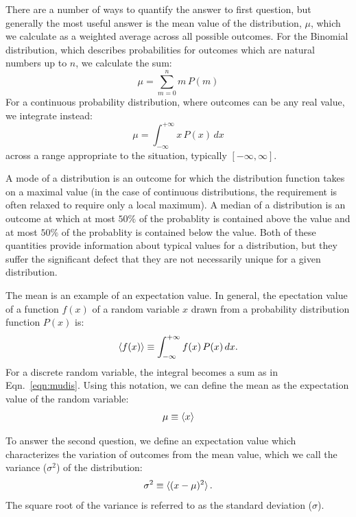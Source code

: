 \documentclass[12pt,oneside]{book}
\begin{document}
There are a number of ways to quantify the answer to first question,
but generally the most useful answer is the mean value of the
distribution, $\mu$, which we calculate as a weighted average across
all possible outcomes.  For the Binomial distribution, which describes
probabilities for outcomes which are natural numbers up to $n$, we
calculate the sum:
\begin{equation}
\label{eqn:mudis}
\mu = \sum_{m=0}^{n} m \, P(m)
\end{equation}
For a continuous probability distribution, where outcomes can be any
real value, we integrate instead:
\begin{equation}
\mu = \int_{-\infty}^{+\infty} x \, P(x) \, dx 
\end{equation}
across a range appropriate to the situation, typically $[-\infty,\infty]$.

A mode of a distribution is an outcome for which the distribution
function takes on a maximal value (in the case of continuous
distributions, the requirement is often relaxed to require only a
local maximum).  A median of a distribution is an outcome at which at
most $50\%$ of the probablity is contained above the value and at most
$50\%$ of the probablity is contained below the value.  Both of these
quantities provide information about typical values for a
distribution, but they suffer the significant defect that they are not
necessarily unique for a given distribution.

The mean is an example of an expectation value.  In general, the
epectation value of a function $f(x)$ of a random variable $x$ drawn
from a probability distribution function $P(x)$ is:
\begin{displaymath}
\braket{f(x)} \equiv \int_{-\infty}^{+\infty} f(x) \, P(x) \,dx.
\end{displaymath}
For a discrete random variable, the integral becomes a sum as in
Eqn.~\ref{eqn:mudis}.  Using this notation, we can define the mean as the
expectation value of the random variable:
\begin{displaymath}
\mu \equiv \braket{x}
\end{displaymath}

To answer the second question, we define an expectation value
which characterizes the variation of outcomes from the mean value,
which we call the variance ($\sigma^2$) of the distribution:
\begin{displaymath}
\sigma^2 \equiv \braket{(x-\mu)^2}.
\end{displaymath}
The square root of the variance is referred to as the
standard deviation ($\sigma$).
\end{document}
